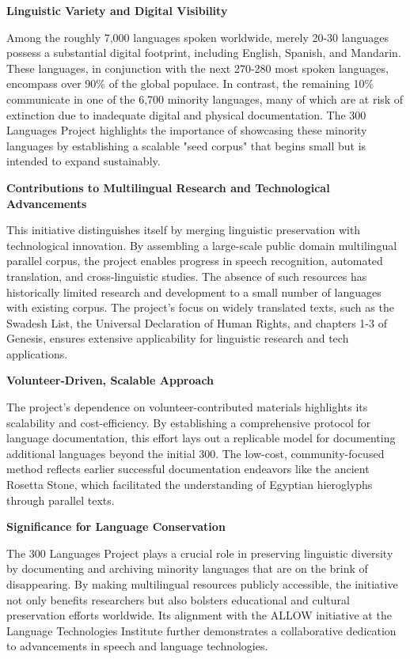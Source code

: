\textbf{Linguistic Variety and Digital Visibility}

Among the roughly 7,000 languages spoken worldwide, merely 20-30 languages possess a substantial digital footprint, including English, Spanish, and Mandarin. These languages, in conjunction with the next 270-280 most spoken languages, encompass over 90\% of the global populace. In contrast, the remaining 10\% communicate in one of the 6,700 minority languages, many of which are at risk of extinction due to inadequate digital and physical documentation. The 300 Languages Project highlights the importance of showcasing these minority languages by establishing a scalable "seed corpus" that begins small but is intended to expand sustainably.

\textbf{Contributions to Multilingual Research and Technological Advancements}

This initiative distinguishes itself by merging linguistic preservation with technological innovation. By assembling a large-scale public domain multilingual parallel corpus, the project enables progress in speech recognition, automated translation, and cross-linguistic studies. The absence of such resources has historically limited research and development to a small number of languages with existing corpus. The project’s focus on widely translated texts, such as the Swadesh List, the Universal Declaration of Human Rights, and chapters 1-3 of Genesis, ensures extensive applicability for linguistic research and tech applications.

\textbf{Volunteer-Driven, Scalable Approach}

The project's dependence on volunteer-contributed materials highlights its scalability and cost-efficiency. By establishing a comprehensive protocol for language documentation, this effort lays out a replicable model for documenting additional languages beyond the initial 300. The low-cost, community-focused method reflects earlier successful documentation endeavors like the ancient Rosetta Stone, which facilitated the understanding of Egyptian hieroglyphs through parallel texts.

\textbf{Significance for Language Conservation}

The 300 Languages Project plays a crucial role in preserving linguistic diversity by documenting and archiving minority languages that are on the brink of disappearing. By making multilingual resources publicly accessible, the initiative not only benefits researchers but also bolsters educational and cultural preservation efforts worldwide. Its alignment with the ALLOW initiative at the Language Technologies Institute further demonstrates a collaborative dedication to advancements in speech and language technologies.

